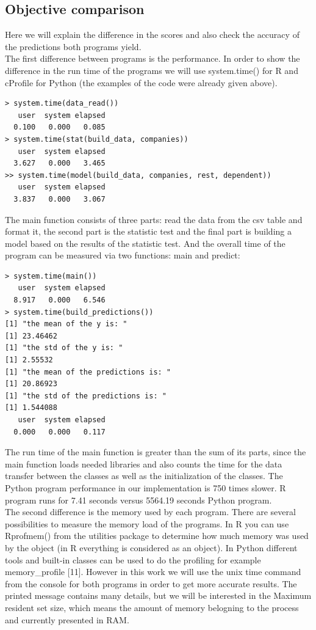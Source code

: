 \documentclass{article}
\begin{document}
\subsection{Objective comparison}
Here we will explain the difference in the scores and also check the accuracy of the predictions both programs yield.\\
The first difference between programs is the performance. In order to show the difference in the run time of the programs we will use system.time() for R and cProfile for Python (the examples of the code were already given above).
\begin{verbatim}
> system.time(data_read())                                                                  
   user  system elapsed                                                                       
  0.100   0.000   0.085  
> system.time(stat(build_data, companies))
   user  system elapsed 
  3.627   0.000   3.465
>> system.time(model(build_data, companies, rest, dependent))
   user  system elapsed 
  3.837   0.000   3.067 
\end{verbatim}
The main function consists of three parts: read the data from the csv table and format it, the second part is the statistic test and the final part is building a model based on the results of the statistic test. And the overall time of the program can be measured via two functions: main and predict:
\begin{verbatim}
> system.time(main())
   user  system elapsed 
  8.917   0.000   6.546 
> system.time(build_predictions())
[1] "the mean of the y is: "
[1] 23.46462
[1] "the std of the y is: "
[1] 2.55532
[1] "the mean of the predictions is: "
[1] 20.86923
[1] "the std of the predictions is: "
[1] 1.544088
   user  system elapsed 
  0.000   0.000   0.117 
\end{verbatim}
The run time of the main function is greater than the sum of its parts, since the main function loads needed libraries and also counts the time for the data transfer between the classes as well as the initialization of the classes. The Python program performance in our implementation is 750 times slower. R program runs for 7.41 seconds versus 5564.19 seconds Python program.\\
The second difference is the memory used by each program. There are several possibilities to measure the memory load of the programs. In R you can use Rprofmem() from the utilities package to determine how much memory was used by the object (in R everything is considered as an object). In Python different tools and built-in classes can be used to do the profiling for example memory\_profile [11]. However in this work we will use the unix time command from the console for both programs in order to get more accurate results. The printed message contains many details, but we will be interested in the Maximum resident set size, which means the amount of memory belogning to the process and currently presented in RAM.\\ 
\end{document}

